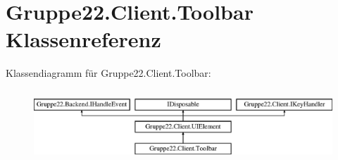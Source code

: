 \hypertarget{class_gruppe22_1_1_client_1_1_toolbar}{\section{Gruppe22.\-Client.\-Toolbar Klassenreferenz}
\label{class_gruppe22_1_1_client_1_1_toolbar}
}
Klassendiagramm für Gruppe22.\-Client.\-Toolbar\-:\begin{figure}[H]
\begin{center}
\leavevmode
\includegraphics[height=2.692308cm]{class_gruppe22_1_1_client_1_1_toolbar}
\end{center}
\end{figure}
